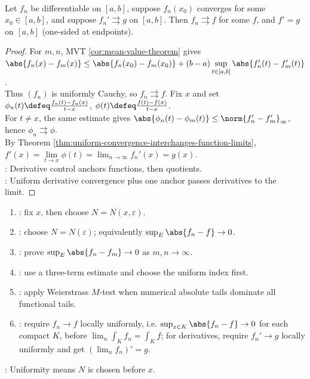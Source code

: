 \begin{theorem} \label{thm:uniform-derivative-convergence} \\
Let $f_n$ be differentiable on $[a,b]$, suppose $f_n(x_0)$ converges for some $x_0\in[a,b]$, and suppose $f_n'\rightrightarrows g$ on $[a,b]$. Then $f_n\rightrightarrows f$ for some $f$, and $f'=g$ on $[a,b]$ (one-sided at endpoints).
\begin{proof}
For $m,n$, MVT \ref{cor:mean-value-theorem} gives $\abs{f_n(x)-f_m(x)}\leq \abs{f_n(x_0)-f_m(x_0)}+(b-a)\sup\limits_{t\in[a,b]}\abs{f_n'(t)-f_m'(t)}$.\\
Thus $(f_n)$ is uniformly Cauchy, so $f_n\rightrightarrows f$. Fix $x$ and set $\phi_n(t)\defeq\frac{f_n(t)-f_n(x)}{t-x}$, $\phi(t)\defeq\frac{f(t)-f(x)}{t-x}$.\\
For $t\neq x$, the same estimate gives $\abs{\phi_n(t)-\phi_m(t)}\leq\norm{f_n'-f_m'}_{\infty}$, hence $\phi_n\rightrightarrows\phi$.\\
By Theorem \ref{thm:uniform-convergence-interchanges-function-limits}, $f'(x)=\lim\limits_{t\to x}\phi(t)=\lim_{n\to\infty}f_n'(x)=g(x)$.\\
: Derivative control anchors functions, then quotients.\\
: Uniform derivative convergence plus one anchor passes derivatives to the limit.
\end{proof}
\end{theorem}

\begin{method} \label{meth:uniform-convergence-proof-patterns-source-todo}\label{meth:uniform-convergence-proof-patterns} 
\begin{enumerate}[label=(\roman*)]
\setlength{\itemsep}{0pt}
\item {}: fix $x$, then choose $N=N(x,\varepsilon)$.
\item {}: choose $N=N(\varepsilon)$; equivalently $\sup_E\abs{f_n-f}\to0$.
\item {}: prove $\sup_E\abs{f_n-f_m}\to0$ as $m,n\to\infty$.
\item {}: use a three-term estimate and choose the uniform index first.
\item {}: apply Weierstrass $M$-test when numerical absolute tails dominate all functional tails.
\item {}: require $f_n\to f$ locally uniformly, i.e. $\sup_{x\in K}\abs{f_n-f}\to0$ for each compact $K$, before $\lim_n\int_K f_n=\int_K f$; for derivatives, require $f_n'\to g$ locally uniformly and get $(\lim_n f_n)'=g$.
\end{enumerate}
: Uniformity means $N$ is chosen before $x$.
\end{method}
